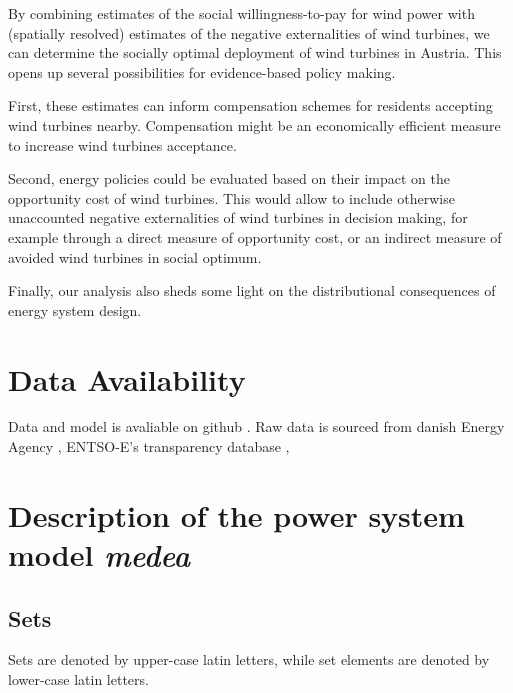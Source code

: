 \documentclass[review, 3p, times]{elsarticle} %
\begin{document}
By combining estimates of the social willingness-to-pay for wind power with (spatially resolved) estimates of the negative externalities of wind turbines, we can determine the socially optimal deployment of wind turbines in Austria.
This opens up several possibilities for evidence-based policy making.

First, these estimates can inform compensation schemes for residents accepting wind turbines nearby.
Compensation might be an economically efficient measure to increase wind turbines acceptance.

Second, energy policies could be evaluated based on their impact on the opportunity cost of wind turbines.
This would allow to include otherwise unaccounted negative externalities of wind turbines in decision making, for example through a direct measure of opportunity cost, or an indirect measure of avoided wind turbines in social optimum.

Finally, our analysis also sheds some light on the distributional consequences of energy system design.


\section{Data Availability}\label{sec:data-availability}
Data and model is avaliable on github \url{}. Raw data is sourced from danish Energy Agency \url{}, ENTSO-E's
transparency database \url{},

\newpage



\newpage
\appendix


\section{Description of the power system model \emph{medea}} \label{sec:medea}

\subsection{Sets} \label{sets}
Sets are denoted by upper-case latin letters, while set elements are denoted by lower-case latin letters.
\end{document}
